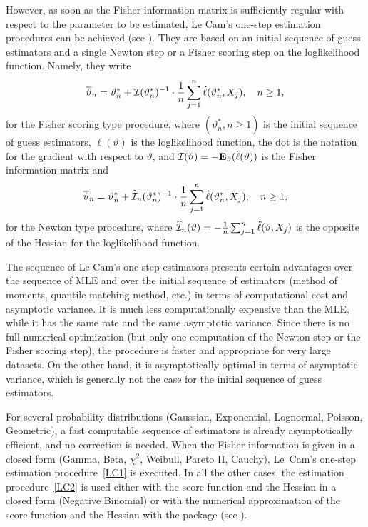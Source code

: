 However, as soon as the Fisher information matrix is sufficiently regular with respect to the parameter to be estimated, Le Cam's one-step estimation procedures can be achieved (see \cite{LeCam}). They are based on an initial sequence
of guess estimators and a single Newton step or a Fisher scoring step on the loglikelihood function. Namely, they write
\begin{equation}\label{LC1}
 \overline{\vartheta}_n  =   \vartheta^*_n  + {\cal I}(\vartheta^*_n)^{-1}\cdot \frac1n \sum_{j=1}^n \dot{\ell} (\vartheta^*_n,X_j), \quad n \geq 1,
\end{equation}
for the Fisher scoring type procedure, where $(\vartheta^*_n, n \geq 1)$ is the initial sequence of guess estimators, $\ell(\vartheta)$ is the loglikelihood function, the dot is the notation for the gradient with respect to $\vartheta$, and ${\cal I}(\vartheta)=-\mathbf{E}_\vartheta( \ddot{\ell} (\vartheta) )$ is the Fisher information matrix and
\begin{equation}\label{LC2}
 \overline{\vartheta}_n  =   \vartheta^*_n  + \widehat{{\cal I}}_n(\vartheta^*_n)^{-1}\cdot \frac1n \sum_{j=1}^n \dot{\ell} (\vartheta^*_n,X_j), \quad n \geq 1,
\end{equation}
for the Newton type procedure, where $\widehat{{\cal I}}_n(\vartheta)= -\frac{1}{n}\sum_{j=1}^n \ddot{\ell} (\vartheta,X_j)$ is the opposite of the Hessian for the loglikelihood function.


The sequence of Le Cam's one-step estimators presents certain advantages over the sequence of MLE and over the initial sequence of estimators (method of moments, quantile matching method, etc.) in terms of computational cost and asymptotic variance. 
It is much less computationally expensive than the MLE, while it has the same rate and the same asymptotic variance. 
Since there is no full numerical optimization (but only one computation of the Newton step or the Fisher scoring step), the procedure 
is faster and appropriate for very large datasets.
On the other hand, it is asymptotically  optimal in terms of asymptotic variance, which is generally not 
the case for the initial sequence of guess estimators. 


For several probability distributions (Gaussian, Exponential, Lognormal, Poisson, Geometric), a fast computable sequence of estimators is already asymptotically efficient, and no correction is needed. When the Fisher information is given in a closed form (Gamma, Beta, $\chi^2$, Weibull, Pareto II, Cauchy), Le~Cam's one-step estimation procedure~\eqref{LC1} is executed.  In all the other cases, the estimation procedure~\eqref{LC2} is used either with the score function and the Hessian in a closed form (Negative Binomial) or with the numerical approximation of the score function and the Hessian with the package  (see \cite{numDeriv19}).


